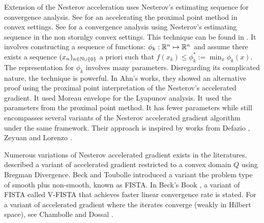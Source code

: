 \documentclass[12pt]{article}
\begin{document}

    \par
    Extension of the Nesterov acceleration uses Nesterov's estimating sequence for convergence analysis. 
    See \cite{guler_new_1992} for an accelerating the proximal point method in convex settings. 
    See \cite{necoara_linear_2019} for a convergence analysis using Nesterov's estimating sequence in the non stornlgy convex settings. 
    This technique can be found in \cite[chapter 2]{nesterov_lectures_2018}. 
    It involves constructing a sequence of functions: $\phi_k:\mathbb R^n \mapsto \mathbb R^n$ and assume there exists a sequence $(x_n)_{n\in \mathbb N \cup \{0\}}$ a priori such that $f(x_k) \le \phi_k^* := \min_x \phi_k(x)$. 
    The representation for $\phi_k$ involves many parameters. 
    Disregarding its complicated nature, the technique is powerful. 
    In Ahn's works, they showed an alternative proof using the proximal point interpretation of the Nesterov's accelerated gradient. 
    It used Moreau envelope for the Lyapunov analysis.
    It used the parameters from the proximal point method. 
    It has fewer parameters while still encompasses several variants of the Nesterov accelerated gradient algorithm under the same framework. 
    Their approach is inspired by works from Defazio \cite{defazio_curved_2019}, Zeyuan and Lorenzo \cite{allen-zhu_linear_2016}. 

    \par
    Numerous variations of Nesterov accelerated gradient exists in the literatures. \cite[(6.1.19)]{nesterov_lectures_2018} described a variant of accelerated gradient restricted to a convex domain $Q$ using Bregman Divergence. 
    Beck and Toubolle \cite{beck_fast_2009} introduced a variant the problem type of smooth plus non-smooth, known as FISTA. 
    In Beck's Book \cite[(10.7.7)]{beck_first-order_nodate}, a variant of FISTA called V-FISTA that achieves faster linear convergence rate is stated. 
    For a variant of accelerated gradient where the iterates converge (weakly in Hilbert space), see Chambolle and Dossal \cite{chambolle_convergence_2015}. 
    
\end{document}
